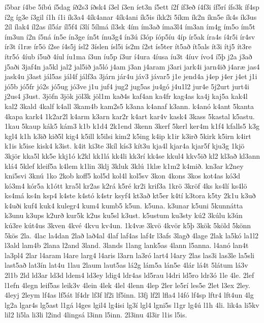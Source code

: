 {í5bar
í4be
5íbú
í5dag
íð2s3
íðsk4
í3el
í3en
íet3n
í5ett
í2f
íf3eð
í4f3i
íf5rí
ífs3k
íf4sp
í2g
íg3e
í3gil
í1h
í1i
ík3a4
4ík4anar
4ík4ani
ík5is
íkk2i
5íkm
ík2n
íkn5e
ík4s
ík3us
2íl
ílak4
íl2as
íl5ár
íl5f4
í3lí
5ílmá
íl3sk
4ím
ím3að
íma3l4
ím3an
ím4g
ím5o
ím5t
ím3un
í2n
í5ná
ín5e
ín3ge
ín5t
ínu3g4
ín3ú
í3óp
íóp5íu
4íp
ír5ak
íra4s
í4r5i
ír4sv
ír3t
í1ræ
ír5ö
í2se
í4s5j
ísl2
3íslen
ísl5i
ís2m
í2st
ís5ter
ít5að
ít5als
ít3i
ítj5
ít3re
ítr5ó
4íub
í5uð
4íul
íu1ma
í3un
íu5p
í3ur
í4ura
4íusa
íu3t
4íuv
ívo4
í5þ
j2a
j3að
j5aði
3jaf4n
ja5kl
jal2
jal5ið
ja5ló
j4am
j3an
j4aram
j3ari
jark4i
jarn4ið
j4aræ
jas4
jask4u
j3ast
jál5as
jál4f
jálf3a
3járn
jár4u
jáv3
jávar5
j1e
jend4a
j4ep
j4er
j4et
j1i
jó5b
jó5fr
jó2s
jó5ug
jó3ve
j1u
juf4
jug2
jug5as
ju4gó
j4u1l2
jur4e
5j2urt
jurt4i
j2us4
j3ust.
3jöfn
3jök
jöl3k
jöl1m
kað4s
kaf4an
ka4fr
kag4as
ka4j
kaj5a
kak4l
kal2
3kald
4kalf
k4all
3kam4b
kam2s5
k3ana
k4anaf
k3ann.
k4anó
k4ant
5kanta
4kapa
kark4
1k2ar2l
k4arm
k3arn
kar2r
k4art
kar4v
kask4
3kass
5kastal
k5astu.
1kau
5kaup
kák5
kám3
k1b
k1d4
2k1end
3kenn
3kerf
5kerl
ker4m
k1f4
kfalls5
k3g
kgl4
k1h
k3ið
kið5l
kig4
k5ill
k5ilsi
kim2
k5ing
k4ip
k1ir
k3irð
5kirk
k5irn
k4irt
k1is
k5ise
kisk4
k3ist.
k4it
ki3te
3kíl
kís3
kít3u
kja4l
kjar4a
kjar5f
kju3g
1kjö
3kjör
kka5l
kk5e
kkj1ó
k2kl
kk1lá
kk4li
kk3rí
kk4se
kkul4
kkv5ið
kl2
kl3að
kl3ann
klá4
5klef
kleif5a
k4lem
k1lin
3klj
3kluk
3klú
1klæ
k1m2
k4mið.
kn3ar
k2ney
kni5svi
3knú
1ko
2kob
koff5
kol5d
kol4l
kol5sv
3kon
4kons
3kos
kot4as
kó3d
kó3m4
kór5a
k1ótt
kra5l
kr2as
k2rá
k5ré
kr2i
krif3a
1krö
3kröf
4ks
ks4lí
ks4lö
ks4má
ks4n
ksp4
k4ste
k4stó
k4str
ksyf4
kt3að
kt5er
k4tí
k3tora
k5ty
2k1u
k3uð
k4uði
kuf4
kuk4
kulegr4
kum4
kumb5
k5un.
k5una.
k3unar
k5uni
5kunnátta
k3unu
k3ups
k2urð
kur5k
k2us
ku5sl
k3ust.
k5ustum
ku3sty
kú2
3kúlu
k3ún
kú3re
kút4us
3kven
4kvé
4kvu
kv4un.
1k4væ
3kvö
4kvör
k5þ
3kök
5köld
5könn
5kös
2la.
4lac
la4dan
2lað
lað4al
4laf
laf4as
laf4r
l3afs
3lagð
4lage
2lak
la5kó
la1l2
l3ald
lam4b
2lana
l2and
3land.
3lands
1lang
lank5as
4lann
l5anna.
l4anó
lan4t
la3pl4
2lar
l4aram
l4are
larg4
l4aris
l3arn
la3ró
lart4
l4ary
2las
las3i
las3le
la5sli
last5að
lat3ín
lat4u
1lau
2laum
laut5as
lá2g
lám5a
lán5e
4lár
lá4t
5látum
lá3v
2l1b
2ld
ld3ar
ld3d
ldem4
ld3ey
ldig4
ldr4as
ld5rau
l4dri
ld5ro
ldr3ó
1le
4le.
2lef
l1efn
4legn
leif5as
leik3v
4lein
4lek
4lel
4lenn
4lep
2ler
le5rí
les5e
2let
l3ex
2ley.
4leyj
2leym
lf4as
lf5át
lf4dr
lf3f
lf2i
lf5inn.
l3fj
lf2l
lfla4
l4fó
lf4sp
lftr4
lft4un
4lg
lg2a
lgar4s
lg5ast
l1gá
l4ges
lgil4
lg4isi
lg3í
lgl4
lgni5s
l1gr
lg4ú
l1h
4li.
lik4a
li5kv
lil2
li5la
li3li
l2ind
4lingsá
l3inn
l5inn.
2l3inu
4l3ir
l1is
l5is.
}
